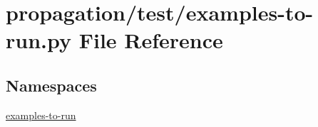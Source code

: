 \hypertarget{propagation_2test_2examples-to-run_8py}{}\section{propagation/test/examples-\/to-\/run.py File Reference}
\label{propagation_2test_2examples-to-run_8py}
\subsection*{Namespaces}
\begin{DoxyCompactItemize}
\item 
 \hyperlink{namespaceexamples-to-run}{examples-\/to-\/run}
\end{DoxyCompactItemize}
